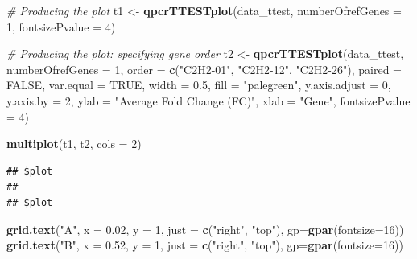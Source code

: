 \documentclass[
]{article}
\newenvironment{Shaded}{\begin{snugshade}}{\end{snugshade}}
\newcommand{\AttributeTok}[1]{\textcolor[rgb]{0.13,0.29,0.53}{#1}}
\newcommand{\CommentTok}[1]{\textcolor[rgb]{0.56,0.35,0.01}{\textit{#1}}}
\newcommand{\ConstantTok}[1]{\textcolor[rgb]{0.56,0.35,0.01}{#1}}
\newcommand{\DecValTok}[1]{\textcolor[rgb]{0.00,0.00,0.81}{#1}}
\newcommand{\FloatTok}[1]{\textcolor[rgb]{0.00,0.00,0.81}{#1}}
\newcommand{\FunctionTok}[1]{\textcolor[rgb]{0.13,0.29,0.53}{\textbf{#1}}}
\newcommand{\NormalTok}[1]{#1}
\newcommand{\OtherTok}[1]{\textcolor[rgb]{0.56,0.35,0.01}{#1}}
\newcommand{\StringTok}[1]{\textcolor[rgb]{0.31,0.60,0.02}{#1}}
\begin{document}
\begin{Shaded}
\begin{Highlighting}[]
\CommentTok{\# Producing the plot}
\NormalTok{t1 }\OtherTok{\textless{}{-}} \FunctionTok{qpcrTTESTplot}\NormalTok{(data\_ttest,}
              \AttributeTok{numberOfrefGenes =} \DecValTok{1}\NormalTok{,}
              \AttributeTok{fontsizePvalue =} \DecValTok{4}\NormalTok{)}

\CommentTok{\# Producing the plot: specifying gene order}
\NormalTok{t2 }\OtherTok{\textless{}{-}} \FunctionTok{qpcrTTESTplot}\NormalTok{(data\_ttest,}
              \AttributeTok{numberOfrefGenes =} \DecValTok{1}\NormalTok{,}
              \AttributeTok{order =} \FunctionTok{c}\NormalTok{(}\StringTok{"C2H2{-}01"}\NormalTok{, }\StringTok{"C2H2{-}12"}\NormalTok{, }\StringTok{"C2H2{-}26"}\NormalTok{),}
              \AttributeTok{paired =} \ConstantTok{FALSE}\NormalTok{,}
              \AttributeTok{var.equal =} \ConstantTok{TRUE}\NormalTok{,}
              \AttributeTok{width =} \FloatTok{0.5}\NormalTok{,}
              \AttributeTok{fill =} \StringTok{"palegreen"}\NormalTok{,}
              \AttributeTok{y.axis.adjust =} \DecValTok{0}\NormalTok{,}
              \AttributeTok{y.axis.by =} \DecValTok{2}\NormalTok{,}
              \AttributeTok{ylab =} \StringTok{"Average Fold Change (FC)"}\NormalTok{,}
              \AttributeTok{xlab =} \StringTok{"Gene"}\NormalTok{,}
              \AttributeTok{fontsizePvalue =} \DecValTok{4}\NormalTok{)}

\FunctionTok{multiplot}\NormalTok{(t1, t2, }\AttributeTok{cols =} \DecValTok{2}\NormalTok{)}
\end{Highlighting}
\end{Shaded}

\begin{verbatim}
## $plot
## 
## $plot
\end{verbatim}

\begin{Shaded}
\begin{Highlighting}[]
\FunctionTok{grid.text}\NormalTok{(}\StringTok{"A"}\NormalTok{, }\AttributeTok{x =} \FloatTok{0.02}\NormalTok{, }\AttributeTok{y =} \DecValTok{1}\NormalTok{, }\AttributeTok{just =} \FunctionTok{c}\NormalTok{(}\StringTok{"right"}\NormalTok{, }\StringTok{"top"}\NormalTok{), }\AttributeTok{gp=}\FunctionTok{gpar}\NormalTok{(}\AttributeTok{fontsize=}\DecValTok{16}\NormalTok{))}
\FunctionTok{grid.text}\NormalTok{(}\StringTok{"B"}\NormalTok{, }\AttributeTok{x =} \FloatTok{0.52}\NormalTok{, }\AttributeTok{y =} \DecValTok{1}\NormalTok{, }\AttributeTok{just =} \FunctionTok{c}\NormalTok{(}\StringTok{"right"}\NormalTok{, }\StringTok{"top"}\NormalTok{), }\AttributeTok{gp=}\FunctionTok{gpar}\NormalTok{(}\AttributeTok{fontsize=}\DecValTok{16}\NormalTok{))}
\end{Highlighting}
\end{Shaded}
\end{document}
